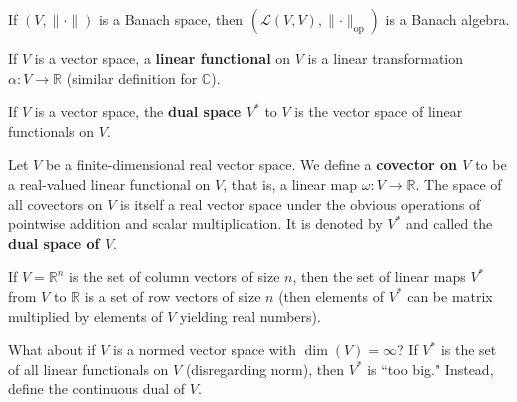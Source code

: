 \begin{corollary}

If \((V, \lVert \cdot \rVert)\) is a Banach space, then \((\mathcal{L}(V, V), \lVert \cdot \rVert_{\text{op}} )\) is a Banach algebra.

\end{corollary}

\begin{definition}\label{ra.def.functional}

If \(V\) is a vector space, a \textbf{linear functional} on \(V\) is a linear transformation \(\alpha: V \to \mathbb{R}\) (similar definition for \(\mathbb{C}\)).

\end{definition}

\begin{definition}\label{ra.def.dual.space}

If \(V\) is a vector space, the \textbf{dual space} \(V^*\) to \(V\) is the vector space of linear functionals on \(V\).

\end{definition}


\begin{definition}

Let \(V\) be a finite-dimensional real vector space. We define a \textbf{covector on \(V\)} to be a real-valued linear functional on \(V\), that is, a linear map \(\omega: V \to \mathbb{R}\). The space of all covectors on \(V\) is itself a real vector space under the obvious operations of pointwise addition and scalar multiplication. It is denoted by \(V^*\) and called the \textbf{dual space of \(V\)}.

\end{definition}

\begin{example}

If \(V = \mathbb{R}^n\) is the set of column vectors of size \(n\), then the set of linear maps \(V^*\) from \(V\) to \(\mathbb{R}\) is a set of row vectors of size \(n\) (then elements of \(V^*\) can be matrix multiplied by elements of \(V\) yielding real numbers).



\end{example}

What about if \(V\) is a normed vector space with \(\dim(V) = \infty\)? If \(V^*\) is the set of all linear functionals on \(V\) (disregarding norm), then \(V^*\) is ``too big." Instead, define the continuous dual of \(V\).

